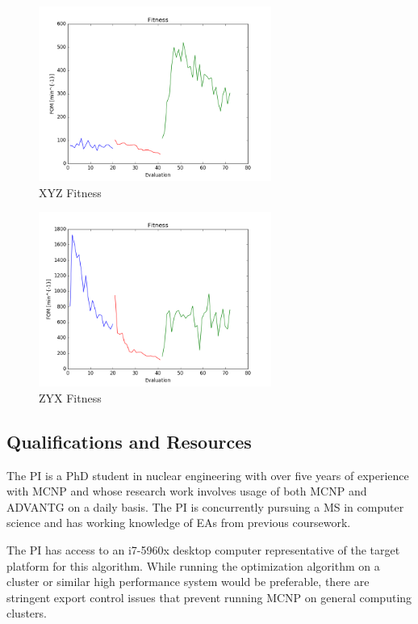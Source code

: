 \documentclass{article}
\begin{document}

\begin{figure}
    \centering
    \includegraphics[width=3.0in]{fitness_xyz}
    \caption{XYZ Fitness}
    \label{fig:fitness_xyz}
\end{figure}

\begin{figure}
    \centering
    \includegraphics[width=3.0in]{fitness_zyx}
    \caption{ZYX Fitness}
    \label{fig:fitness_zyx}
\end{figure}

\subsection{Qualifications and Resources}\label{sec:b4}
The PI is a PhD student in nuclear engineering with over five years of experience with MCNP and whose research work involves usage of both MCNP and ADVANTG on a daily basis. The PI is concurrently pursuing a MS in computer science and has working knowledge of EAs from previous coursework.

The PI has access to an i7-5960x desktop computer representative of the target platform for this algorithm. While running the optimization algorithm on a cluster or similar high performance system would be preferable, there are stringent export control issues that prevent running MCNP on general computing clusters. 
\end{document}
